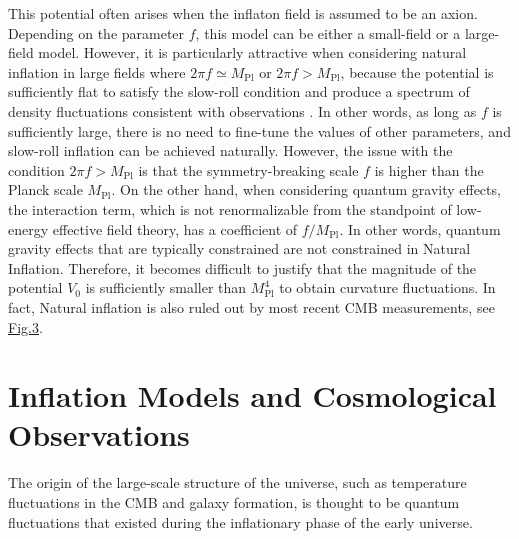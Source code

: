 \documentclass[12pt]{article}
\numberwithin{equation}{section}
\begin{document}
\noindent This potential often arises when the inflaton field is assumed to be an axion. Depending on the parameter $f$, this model can be either a small-field or a large-field model. However, it is particularly attractive when considering natural inflation in large fields where $2\pi f \simeq M_{\textrm{Pl}}$ or $2\pi f > M_{\textrm{Pl}}$, because the potential is sufficiently flat to satisfy the slow-roll condition and produce a spectrum of density fluctuations consistent with observations \cite{Freese:1990rb}. In other words, as long as $f$ is sufficiently large, there is no need to fine-tune the values of other parameters, and slow-roll inflation can be achieved naturally. However, the issue with the condition $2\pi f > M_{\textrm{Pl}}$ is that the symmetry-breaking scale $f$ is higher than the Planck scale $M_{\textrm{Pl}}$. On the other hand, when considering quantum gravity effects, the interaction term, which is not renormalizable from the standpoint of low-energy effective field theory, has a coefficient of $f/M_{\textrm{Pl}}$. In other words, quantum gravity effects that are typically constrained are not constrained in Natural Inflation. Therefore, it becomes difficult to justify that the magnitude of the potential $V_0$ is sufficiently smaller than $M_{\textrm{Pl}}^4$ to obtain curvature fluctuations. In fact, Natural inflation is also ruled out by most recent CMB measurements, see \hyperref[fig:Planck]{Fig.3}.

\section{Inflation Models and Cosmological Observations}
The origin of the large-scale structure of the universe, such as temperature fluctuations in the CMB and galaxy formation, is thought to be quantum fluctuations that existed during the inflationary phase of the early universe.
\end{document}
